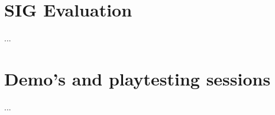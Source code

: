 	\section{SIG Evaluation} \label{sec:sigevaluation}
		...
		
	\section{Demo's and playtesting sessions} \label{sec:demos}
		...
